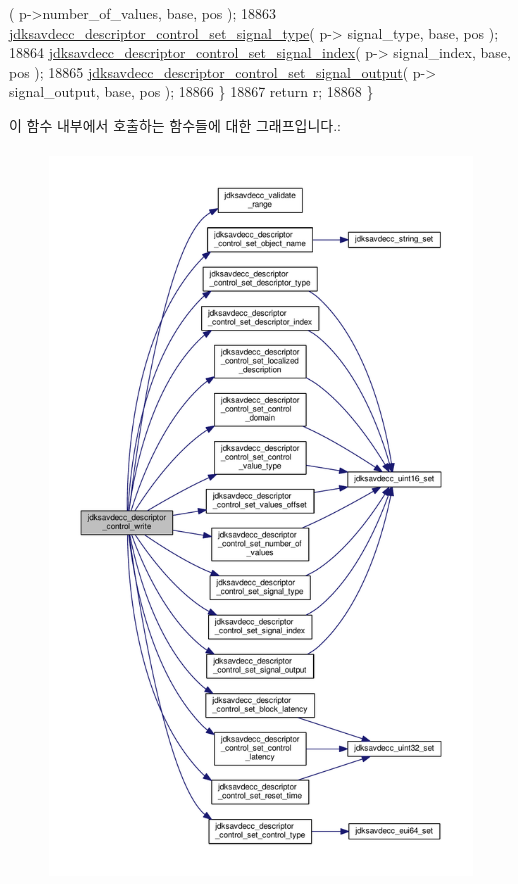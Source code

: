 \begin{DoxyCode}
      ( p->number\_of\_values, base, pos );
18863         \hyperlink{group__descriptor__control_ga4150128b82314fbe39ed886ab7f0b8de}{jdksavdecc\_descriptor\_control\_set\_signal\_type}( p->
      signal\_type, base, pos );
18864         \hyperlink{group__descriptor__control_gaf4e4b4de104f183a2b743cea1153569c}{jdksavdecc\_descriptor\_control\_set\_signal\_index}( p->
      signal\_index, base, pos );
18865         \hyperlink{group__descriptor__control_gaacbe07116eecbed5629993506cb4eda0}{jdksavdecc\_descriptor\_control\_set\_signal\_output}( p->
      signal\_output, base, pos );
18866     \}
18867     \textcolor{keywordflow}{return} r;
18868 \}
\end{DoxyCode}


이 함수 내부에서 호출하는 함수들에 대한 그래프입니다.\+:
\nopagebreak
\begin{figure}[H]
\begin{center}
\leavevmode
\includegraphics[height=550pt]{group__descriptor__control_gac9d02e62bb2f9fff2ee663c184caacbf_cgraph}
\end{center}
\end{figure}



